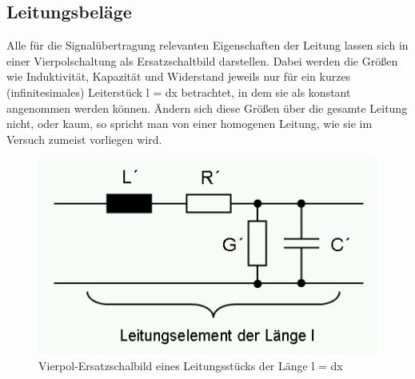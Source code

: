 \subsection{Leitungsbeläge} %
\label{sub:leitungsbel_ge}

	Alle für die Signalübertragung relevanten Eigenschaften der Leitung lassen sich in einer Vierpolschaltung als Ersatzschaltbild darstellen. 
	Dabei werden die Größen wie Induktivität, Kapazität und Widerstand jeweils nur für ein kurzes (infinitesimales) Leiterstück l = dx betrachtet, in dem sie als konstant angenommen werden können. 
	Ändern sich diese Größen über die gesamte Leitung nicht, oder kaum, so spricht man von einer homogenen Leitung, wie sie im Versuch zumeist vorliegen wird.

	\begin{figure}[H]
		\center	
		\includegraphics[scale = 0.9]{messwerte/Leitungsbelaege.jpg}
		\caption{\centering Vierpol-Ersatzschalbild eines Leitungsstücks der Länge l = dx \cite{vierpol}} %
		\label{leitungsbelaege}
	\end{figure}


